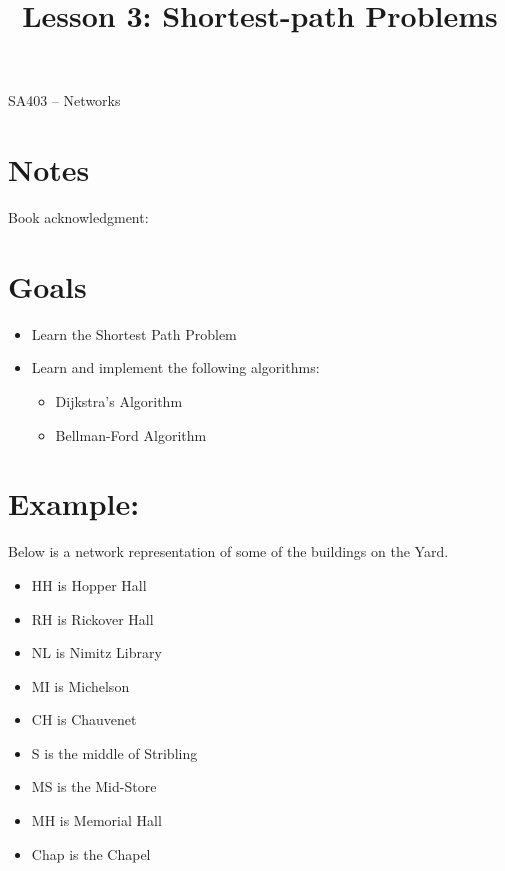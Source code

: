 \documentclass[12pt]{article}
\makeatletter
\theoremstyle{definition}
\newcommand{\graphbox}[5]%
{
\begin{tikzpicture}
     [>=latex,scale=#5]
     
     \draw [->,very thick] (#1, 0) -- (#2, 0) node[right] {$x$};
     \draw [->,very thick] (0, #3) -- (0, #4) node[above] {$y$};
     
     \draw[step=1cm,thick,dotted] (#1,#3) grid (#2,#4);
   \end{tikzpicture}
   }
\renewcommand{\maketitle}{
  \noindent SA403 -- Networks \\

  \begin{center}\Large{\textbf{\@title}}\end{center}
}
\makeatother
\begin{document}

\title{Lesson 3: Shortest-path Problems}


\maketitle


\section*{Notes}

Book acknowledgment:
\section*{Goals}
\begin{itemize}
	\item Learn the Shortest Path Problem
	\item Learn and implement the following algorithms:
	\begin{itemize}
		\item Dijkstra's Algorithm
		\item Bellman-Ford Algorithm
	\end{itemize}
\end{itemize}


\section*{Example:}

Below is a network representation of some of the buildings on the Yard. 
\begin{itemize}
\item HH is Hopper Hall
\item RH is Rickover Hall
\item NL is Nimitz Library
\item MI is Michelson
\item CH is Chauvenet
\item S is the middle of Stribling
\item MS is the Mid-Store
\item MH is Memorial Hall
\item Chap is the Chapel
\end{itemize}
\end{document}
